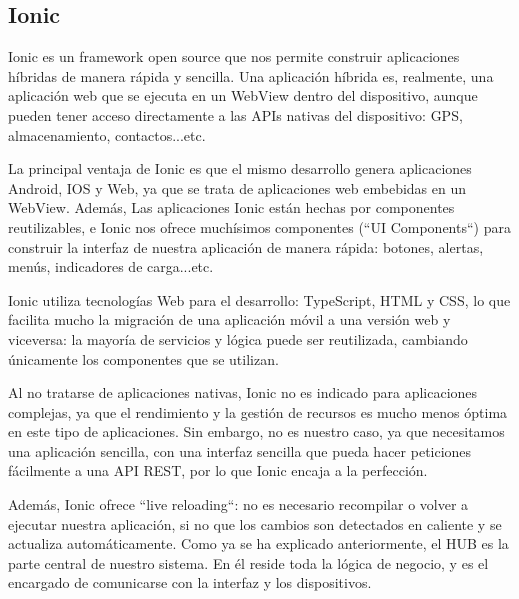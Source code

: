 \subsection{Ionic}
Ionic es un framework open source que nos permite construir aplicaciones híbridas de manera rápida y sencilla. Una aplicación híbrida es, realmente, una
aplicación web que se ejecuta en un WebView dentro del dispositivo, aunque pueden tener acceso directamente a las APIs nativas del dispositivo: GPS, almacenamiento, 
contactos...etc.
\par
La principal ventaja de Ionic es que el mismo desarrollo genera aplicaciones Android, IOS y Web, ya que se trata de aplicaciones web embebidas en un WebView. Además,
Las aplicaciones Ionic están hechas por componentes reutilizables, e Ionic nos ofrece muchísimos componentes (``UI Components``) para construir la interfaz de nuestra
aplicación de manera rápida: botones, alertas, menús, indicadores de carga...etc.
\par
Ionic utiliza tecnologías Web para el desarrollo: TypeScript, HTML y CSS, lo que facilita mucho la migración de una aplicación móvil a una versión web y viceversa: la
mayoría de servicios y lógica puede ser reutilizada, cambiando únicamente los componentes que se utilizan.
\par
Al no tratarse de aplicaciones nativas, Ionic no es indicado para aplicaciones complejas, ya que el rendimiento y la gestión de recursos es mucho menos óptima en
este tipo de aplicaciones. Sin embargo, no es nuestro caso, ya que necesitamos una aplicación sencilla, con una interfaz sencilla que pueda hacer peticiones fácilmente
a una API REST, por lo que Ionic encaja a la perfección.
\par
Además, Ionic ofrece ``live reloading``: no es necesario recompilar o volver a ejecutar nuestra aplicación, si no que los cambios son detectados en caliente y se actualiza
automáticamente.
Como ya se ha explicado anteriormente, el HUB es la parte central de nuestro sistema. En él reside toda la lógica de negocio, y es el encargado
de comunicarse con la interfaz y los dispositivos.
